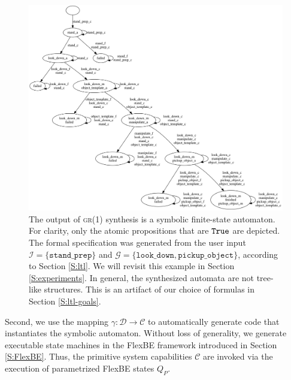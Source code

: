 \begin{figure}[t]
\centering
\includegraphics[width=0.95\columnwidth,clip]{./img/synthesized_automaton.png}
\caption{
	The output of \textsc{gr(1)} synthesis is a symbolic finite-state automaton.
	For clarity, only the atomic propositions that are $\mathtt{True}$ are depicted.
	The formal specification was generated from the user input $\mathcal{I} = \{ \mathtt{stand\_prep} \}$ and $\mathcal{G} = \{ \mathtt{look\_down, pickup\_object} \}$, according to Section \ref{S:ltl}.
	We will revisit this example in Section \ref{S:experiments}.
	In general, the synthesized automata are not tree-like structures.
	This is an artifact of our choice of formulas in Section \ref{S:ltl-goals}.
}
\label{Fig:SynthesizedAutomaton}
\vspace{-10pt}
\end{figure}

Second, we use the mapping $\gamma: \mathcal{D} \rightarrow \mathcal{C}$ to automatically generate code that instantiates the symbolic automaton.
Without loss of generality, we generate executable state machines in the FlexBE framework introduced in Section \ref{S:FlexBE}.
Thus, the primitive system capabilities $\mathcal{C}$ are invoked via the execution of parametrized FlexBE states $Q_P$.


